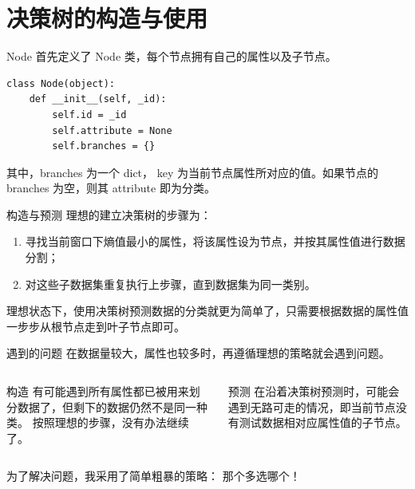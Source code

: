 \documentclass[10pt]{beamer}
\begin{document}
\section{决策树的构造与使用}
\begin{frame}[fragile]{Node}
首先定义了 Node 类，每个节点拥有自己的属性以及子节点。
\begin{verbatim}
class Node(object):
    def __init__(self, _id):
        self.id = _id
        self.attribute = None
        self.branches = {}           
\end{verbatim}
其中，branches 为一个 dict， key 为当前节点属性所对应的值。如果节点的 branches 为空，则其 attribute 即为分类。

\end{frame}

\begin{frame}{构造与预测}
  理想的建立决策树的步骤为：
  \begin{enumerate}
    \item 寻找当前窗口下熵值最小的属性，将该属性设为节点，并按其属性值进行数据分割；
    \item 对这些子数据集重复执行上步骤，直到数据集为\alert{同一类别}。
  \end{enumerate}
  理想状态下，使用决策树预测数据的分类就更为简单了，只需要根据数据的属性值一步步从根节点走到叶子节点即可。
\end{frame}




\begin{frame}[fragile]{遇到的问题}
  在数据量较大，属性也较多时，再遵循理想的策略就会遇到问题。
  \begin{columns}[T,onlytextwidth]
    \begin{alertblock}{构造}
    有可能遇到所有属性都已被用来划分数据了，但剩下的数据仍然不是同一种类。
    按照理想的步骤，没有办法继续了。
    \end{alertblock}

    \begin{alertblock}{预测}
    在沿着决策树预测时，可能会遇到无路可走的情况，即当前节点没有测试数据相对应属性值的子节点。
    \end{alertblock}
  \end{columns}

  \vfill
  为了解决问题，我采用了简单粗暴的策略：
  \alert{那个多选哪个！}
\end{frame}
\end{document}
